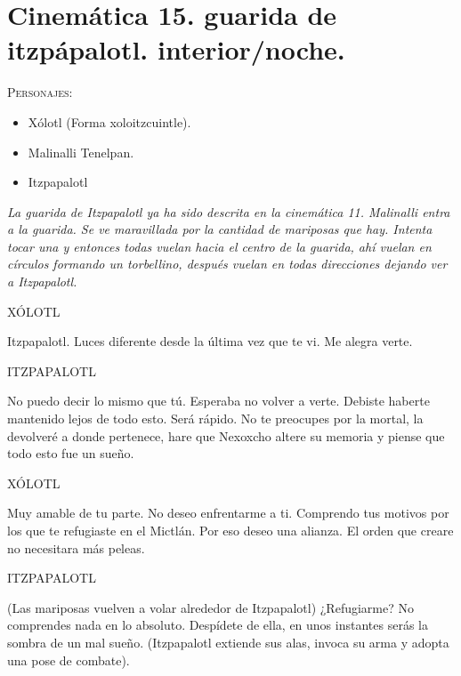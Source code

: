 \documentclass[11pt,letterpaper]{article}
\begin{document}
\section{Cinemática 15. guarida de itzpápalotl. interior/noche.}
 \textsc{Personajes}:
 \begin{itemize}
 \item Xólotl (Forma xoloitzcuintle).
 \item Malinalli Tenelpan.
 \item Itzpapalotl
 \end{itemize}
 \textit{La guarida de Itzpapalotl ya ha sido descrita en la cinemática 11. Malinalli entra a la guarida. Se ve maravillada por la cantidad de mariposas que hay. Intenta tocar una y entonces todas vuelan hacia el centro de la guarida, ahí vuelan en círculos formando un torbellino, después vuelan en todas direcciones dejando ver a Itzpapalotl.}
 \begin{center}
 XÓLOTL
 \\
\par
Itzpapalotl. Luces diferente desde la última vez que te vi. Me alegra verte.
\\
\par
ITZPAPALOTL
\\
\par
No puedo decir lo mismo que tú. Esperaba no volver a verte. Debiste haberte mantenido lejos de todo esto. Será rápido. No te preocupes por la mortal, la devolveré a donde pertenece, hare que Nexoxcho altere su memoria y piense que todo esto fue un sueño.
\\
\par
XÓLOTL
\\
\par
Muy amable de tu parte. No deseo enfrentarme a ti. Comprendo tus motivos por los que te refugiaste en el Mictlán. Por eso deseo una alianza. El orden que creare no necesitara más peleas.
\\
\par
ITZPAPALOTL
\\
\par
(Las mariposas vuelven a volar alrededor de Itzpapalotl) ¿Refugiarme? No comprendes nada en lo absoluto. Despídete de ella, en unos instantes serás la sombra de un mal sueño.  (Itzpapalotl extiende sus alas, invoca su arma y adopta una pose de combate).
 \end{center}
 
\end{document}
